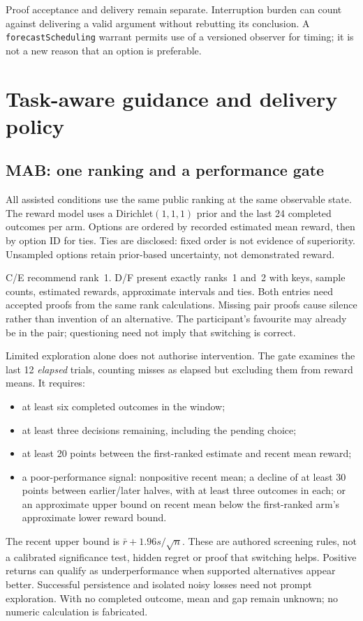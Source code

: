 \documentclass[11pt,a4paper]{article}
\begin{document}
Proof acceptance and delivery remain separate. Interruption burden can count against delivering a valid argument without rebutting its conclusion. A \texttt{forecastScheduling} warrant permits use of a versioned observer for timing; it is not a new reason that an option is preferable.

\section{Task-aware guidance and delivery policy}
\subsection{MAB: one ranking and a performance gate}
All assisted conditions use the same public ranking at the same observable state. The reward model uses a Dirichlet$(1,1,1)$ prior and the last 24 completed outcomes per arm. Options are ordered by recorded estimated mean reward, then by option ID for ties. Ties are disclosed: fixed order is not evidence of superiority. Unsampled options retain prior-based uncertainty, not demonstrated reward.

C/E recommend rank~1. D/F present exactly ranks~1 and~2 with keys, sample counts, estimated rewards, approximate intervals and ties. Both entries need accepted proofs from the same rank calculations. Missing pair proofs cause silence rather than invention of an alternative. The participant's favourite may already be in the pair; questioning need not imply that switching is correct.

Limited exploration alone does not authorise intervention. The gate examines the last 12 \emph{elapsed} trials, counting misses as elapsed but excluding them from reward means. It requires:
\begin{itemize}
\item at least six completed outcomes in the window;
\item at least three decisions remaining, including the pending choice;
\item at least 20 points between the first-ranked estimate and recent mean reward;
\item a poor-performance signal: nonpositive recent mean; a decline of at least 30 points between earlier/later halves, with at least three outcomes in each; or an approximate upper bound on recent mean below the first-ranked arm's approximate lower reward bound.
\end{itemize}
The recent upper bound is $\bar r+1.96s/\sqrt n$. These are authored screening rules, not a calibrated significance test, hidden regret or proof that switching helps. Positive returns can qualify as underperformance when supported alternatives appear better. Successful persistence and isolated noisy losses need not prompt exploration. With no completed outcome, mean and gap remain unknown; no numeric calculation is fabricated.
\end{document}
